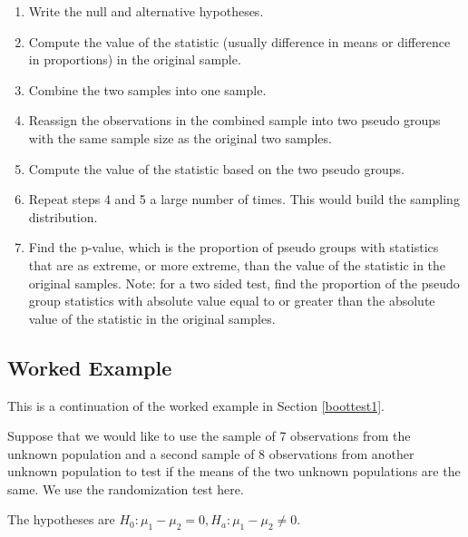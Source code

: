 \documentclass[
]{book}
\providecommand{\tightlist}{%
  \setlength{\itemsep}{0pt}\setlength{\parskip}{0pt}}
\theoremstyle{definition}
\theoremstyle{definition}
\theoremstyle{definition}
\theoremstyle{definition}
\theoremstyle{remark}
\begin{document}
\begin{enumerate}
\def\labelenumi{\arabic{enumi}.}
\tightlist
\item
  Write the null and alternative hypotheses.
\item
  Compute the value of the statistic (usually difference in means or difference in proportions) in the original sample.
\item
  Combine the two samples into one sample.
\item
  Reassign the observations in the combined sample into two pseudo groups with the same sample size as the original two samples.
\item
  Compute the value of the statistic based on the two pseudo groups.
\item
  Repeat steps 4 and 5 a large number of times. This would build the sampling distribution.
\item
  Find the p-value, which is the proportion of pseudo groups with statistics that are as extreme, or more extreme, than the value of the statistic in the original samples. Note: for a two sided test, find the proportion of the pseudo group statistics with absolute value equal to or greater than the absolute value of the statistic in the original samples.
\end{enumerate}

\hypertarget{worked-example-3}{%
\subsection{Worked Example}\label{worked-example-3}}

This is a continuation of the worked example in Section \ref{boottest1}.

Suppose that we would like to use the sample of 7 observations from the unknown population and a second sample of 8 observations from another unknown population to test if the means of the two unknown populations are the same. We use the randomization test here.

The hypotheses are \(H_0: \mu_1 - \mu_2 = 0, H_a: \mu_1 - \mu_2 \neq 0\).
\end{document}
